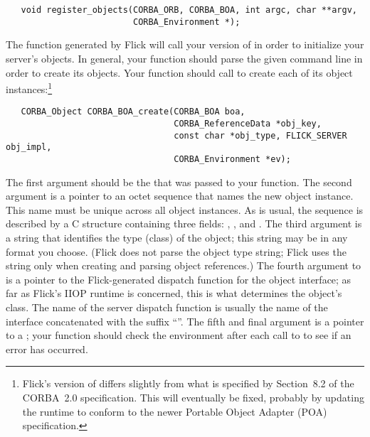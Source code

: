 \begin{verbatim}
   void register_objects(CORBA_ORB, CORBA_BOA, int argc, char **argv,
                         CORBA_Environment *);
\end{verbatim}

\noindent The  function generated by Flick will call your
version of  in order to initialize your server's
objects.  In general, your  function should parse
the given command line in order to create its objects.  Your function should
call  to create each of its object
instances:\footnote{Flick's version of  differs
slightly from what is specified by Section~8.2 of the CORBA~2.0
specification.  This will eventually be fixed, probably by updating the runtime
to conform to the newer Portable Object Adapter (POA) specification.}

\begin{verbatim}
   CORBA_Object CORBA_BOA_create(CORBA_BOA boa,
                                 CORBA_ReferenceData *obj_key,
                                 const char *obj_type, FLICK_SERVER obj_impl,
                                 CORBA_Environment *ev);
\end{verbatim}

\noindent The first argument should be the  that was passed to
your  function.  The second argument is a pointer
to an octet sequence that names the new object instance.  This name must be
unique across all object instances.  As is usual, the sequence is described by
a C structure containing three fields: ,
, and .  The third argument is a
string that identifies the type (class) of the object; this string may be in
any format you choose.  (Flick does not parse the object type string; Flick
uses the string only when creating and parsing object references.)  The fourth
argument to  is a pointer to the Flick-generated
dispatch function for the object interface; as far as Flick's IIOP runtime is
concerned, this is what determines the object's class.  The name of the server
dispatch function is usually the name of the interface concatenated with the
suffix ``''.  The fifth and final argument is a pointer to a
; your  function should
check the environment after each call to  to see if
an error has occurred.

